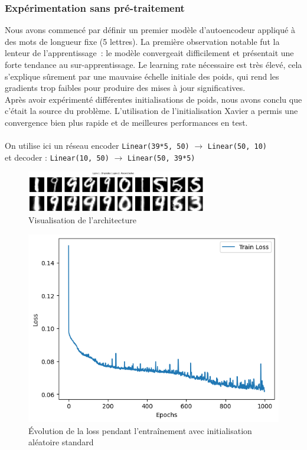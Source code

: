 \documentclass{article}
\begin{document}
\subsubsection{Expérimentation sans pré-traitement}

Nous avons commencé par définir un premier modèle d’autoencodeur appliqué à des mots de longueur fixe (5 lettres). La première observation notable fut la lenteur de l’apprentissage~: le modèle convergeait difficilement et présentait une forte tendance au sur-apprentissage. Le learning rate nécessaire est très élevé, cela s’explique sûrement par une mauvaise échelle initiale des poids, qui rend les gradients trop faibles pour produire des mises à jour significatives.
\\
Après avoir expérimenté différentes initialisations de poids, nous avons conclu que c’était la source du problème. L’utilisation de l’initialisation Xavier a permis une convergence bien plus rapide et de meilleures performances en test.
\\ \\
On utilise ici un réseau encoder \texttt{Linear(39*5, 50)} $\rightarrow$ \texttt{Linear(50, 10)} 
\\
et decoder : \texttt{Linear(10, 50)} $\rightarrow$ \texttt{Linear(50, 39*5)}

\begin{figure}[H]
    \centering
    \includegraphics[width=0.7\textwidth]{Images/autoecodeur.png}
    \caption{Visualisation de l'architecture}
    \label{fig:mirror_example}
\end{figure}

\begin{figure}[H]
    \centering
    \includegraphics[width=0.6\linewidth]{Images/loss_no_init.png}
    \caption{Évolution de la loss pendant l’entraînement avec initialisation aléatoire standard}
    \label{fig:loss_no_init}
\end{figure}
\end{document}
